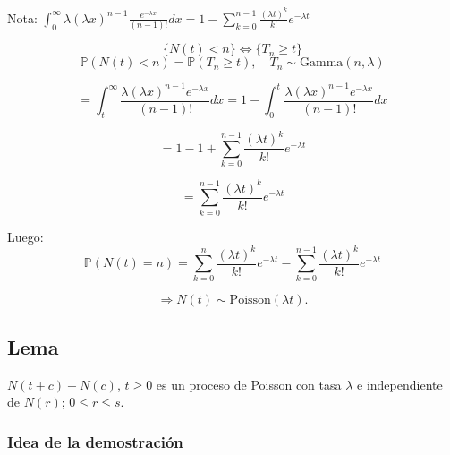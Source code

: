 \documentclass[12pt]{article}
\begin{document}
Nota: $\int_0^{\infty} \lambda (\lambda x)^{n-1} \frac{e^{-\lambda x}}{(n-1)!} dx = 1 - \sum_{k=0}^{n-1} \frac{(\lambda t)^k}{k!} e^{-\lambda t}$

\begin{equation*}
\{N(t) < n\} \Leftrightarrow \{T_n \geq t\}
\end{equation*}
\begin{equation*}
\mathbb{P}(N(t) < n) = \mathbb{P}(T_n \geq t), \quad T_n \sim \text{Gamma}(n, \lambda)
\end{equation*}

\begin{equation*}
= \int_t^{\infty} \frac{\lambda (\lambda x)^{n-1} e^{-\lambda x}}{(n-1)!} dx = 1 - \int_0^t \frac{\lambda (\lambda x)^{n-1} e^{-\lambda x}}{(n-1)!} dx
\end{equation*}

\begin{equation*}
= 1 - 1 + \sum_{k=0}^{n-1} \frac{(\lambda t)^k}{k!} e^{-\lambda t}
\end{equation*}

\begin{equation*}
= \sum_{k=0}^{n-1} \frac{(\lambda t)^k}{k!} e^{-\lambda t}
\end{equation*}

Luego:
\begin{equation*}
\mathbb{P}(N(t) = n) = \sum_{k=0}^{n} \frac{(\lambda t)^k}{k!} e^{-\lambda t} - \sum_{k=0}^{n-1} \frac{(\lambda t)^k}{k!} e^{-\lambda t}
\end{equation*}

\begin{equation*}
\Rightarrow N(t) \sim \text{Poisson}(\lambda t).
\end{equation*}

\subsection*{Lema}

$N(t+c) - N(c)$, $t \geq 0$ es un proceso de Poisson con tasa $\lambda$ e independiente de $N(r)$; $0 \leq r \leq s$.

\subsubsection*{Idea de la demostración}

\begin{center}
\end{center}
\end{document}
